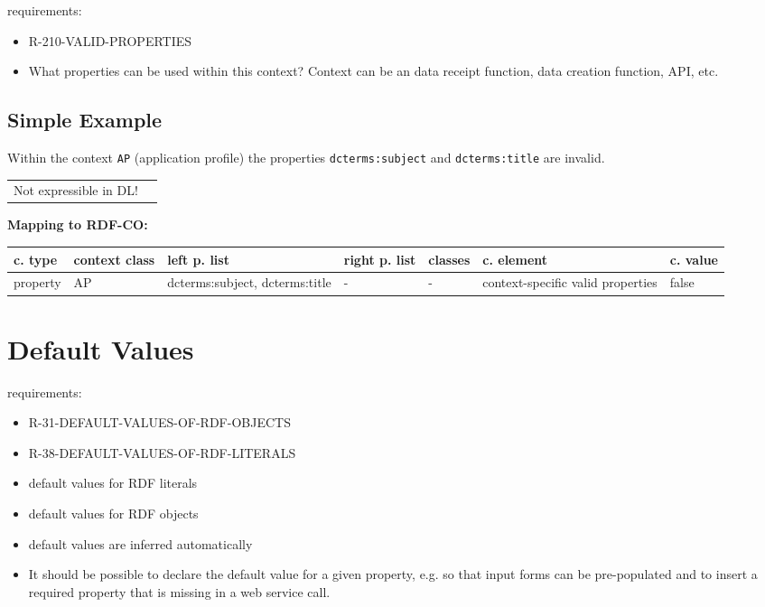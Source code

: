 \documentclass{llncs}
\newcommand{\ms}[1]{\texttt{#1}}
\newenvironment{gcotable}{
  \scriptsize
  \sffamily
  \vspace{0cm}
	\begin{center}
	\textbf{\vspace{0.4cm}Mapping to RDF-CO:} \\
  \begin{tabular}{l|l|l|l|l|l|l}
	\hline
  \textbf{c. type} & \textbf{context class} & \textbf{left p. list} & \textbf{right p. list} & \textbf{classes} & \textbf{c. element} & \textbf{c. value} \\
  \hline

}{
  \hline
  \end{tabular}
	\end{center}
}
\newenvironment{DL}{
  \vspace{0cm}
	\begin{center}
  \begin{tabular}{r l}

}{
  \end{tabular}
	\end{center}
}
\begin{document}
requirements:

\begin{itemize}
	\item R-210-VALID-PROPERTIES
\end{itemize}

\begin{itemize}
	\item What properties can be used within this context? Context can be an data receipt function, data creation function, API, etc.
\end{itemize}

\subsection{Simple Example}

Within the context \ms{AP} (application profile) the properties \ms{dcterms:subject} and \ms{dcterms:title} are invalid.

\begin{DL}
Not expressible in DL!
\end{DL}

\begin{gcotable}
property & AP & dcterms:subject, dcterms:title & - & - & context-specific valid properties & false \\
\end{gcotable}

\section{Default Values}

requirements:

\begin{itemize}
	\item R-31-DEFAULT-VALUES-OF-RDF-OBJECTS
  \item R-38-DEFAULT-VALUES-OF-RDF-LITERALS
\end{itemize}



\begin{itemize}
	\item default values for RDF literals
	\item default values for RDF objects
	\item default values are inferred automatically
	\item It should be possible to declare the default value for a given property, e.g. so that input forms can be pre-populated and to insert a required property that is missing in a web service call. 
\end{itemize}
\end{document}
